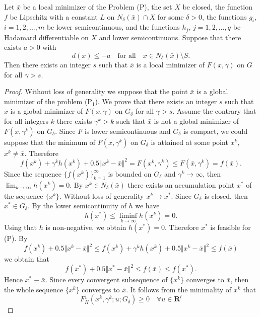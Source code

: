 \documentclass[10pt,a4paper]{amsart}
\def\E{\mathbf R^l}
\def\ld#1{#1^{\downarrow}_{H}}
\newcommand{\norm}[1]{\Vert#1\Vert}
\begin{document}
\begin{theorem}\label{th-penalty}
Let $\bar x$ be a local minimizer  of the Problem {\rm (P)}, the set $X$ be
closed, the function $f$ be Lipschitz with a constant $L$ on
$N_\delta(\bar x)\cap X$ for some $\delta>0$, the functions $g_i$, $i=1,2,...,m$
be lower semicontinuous, and the functions $h_j$, $j=1,2,...,q$ be Hadamard
differentiable on $X$ and lower semicontinuous. Suppose that there exists $a>0$
with
\begin{equation}\label{6}
d(x)\le -a\quad\textrm{for all}\quad x\in N_\delta(\bar x)\setminus S.
\end{equation}
Then  there exists an integer $s$ such that $\bar x$ is a local minimizer
of $F(x,\gamma)$ on $G$ for all $\gamma>s$.
\end{theorem}

\begin{proof}
Without loss of generality we suppose that
the point $\bar x$ is a global minimizer of the problem (P$_1$).
We prove that there exists an integer $s$ such that $\bar x$ is a global
minimizer of $F(x,\gamma)$ on $G_\delta$ for all $\gamma>s$.
Assume the contrary that for all integers $k$ there exists $\gamma^k>k$
such that $\bar x$ is not a global minimizer of $F(x,\gamma^k)$ on $G_\delta$. 
Since $F$ is lower semicontinuous and $G_\delta$ is compact, we could suppose
that the minimum of $F(x,\gamma^k)$ on $G_\delta$ is attained at some point
$x^k$, $x^k\ne\bar x$. Therefore
\begin{equation}\label{p1}
f(x^k)+\gamma^k h(x^k)+0.5\norm{x^k-\bar x}^2=F(x^k,\gamma^k)\le F(\bar x,\gamma^k)=f(\bar x).
\end{equation}
Since the sequence $\{f(x^k)\}_{k=1}^\infty$ is bounded on $G_\delta$ and
$\gamma^k\to\infty$, then $\lim_{k\to\infty} h(x^k)=0$. By $x^k\in N_\delta(\bar x)$
there exists an accumulation point $x^*$ of the sequence $\{x^k\}$.
Without loss of generality $x^k\to x^*$. Since $G_\delta$ is closed, then $x^*\in G_\delta$.
By the lower semicontinuity of $h$ we have
\[
h(x^*)\le\liminf_{k\to\infty}h(x^k)=0.
\]
Using that $h$ is non-negative, we obtain $h(x^*)=0$.
Therefore $x^*$ is feasible for (P). By
\[
f(x^k)+0.5\norm{x^k-\bar x}^2\le f(x^k)+\gamma^k h(x^k)+0.5\norm{x^k-\bar x}^2\le f(\bar x)
\]
we obtain that
\[
f(x^*)+0.5\norm{x^*-\bar x}^2\le f(\bar x)\le f(x^*).
\]
Hence
$x^*\equiv\bar x$. Since every convergent subsequence of $\{x^k\}$ converges
to $\bar x$, then the whole sequence $\{x^k\}$ converges to $\bar x$.
It follows from the minimality of $x^k$ that
\begin{equation}\label{3}
\ld F(x^k,\gamma^k;u;G_\delta)\ge 0\quad\forall u\in \E
\end{equation}


\end{proof}
\end{document}
